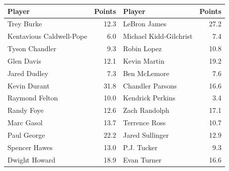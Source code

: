 \documentclass[letterpaper]{exam}
\begin{document}
\begin{questions}
      \begin{table}[ht]
        \centering
        \begin{tabular}{lr|lr}
          \toprule
          Player                   & Points & Player                 & Points\\
          \midrule
          Trey Burke               & 12.3   & LeBron James           & 27.2 \\
          Kentavious Caldwell-Pope & 6.0    & Michael Kidd-Gilchrist & 7.4 \\
          Tyson Chandler           & 9.3    & Robin Lopez            & 10.8 \\
          Glen Davis               & 12.1   & Kevin Martin           & 19.2 \\
          Jared Dudley             & 7.3    & Ben McLemore           & 7.6 \\
          Kevin Durant             & 31.8   & Chandler Parsons       & 16.6 \\
          Raymond Felton           & 10.0   & Kendrick Perkins       & 3.4 \\
          Randy Foye               & 12.6   & Zach Randolph          & 17.1 \\
          Marc Gasol               & 13.7   & Terrence Ross          & 10.7 \\
          Paul George              & 22.2   & Jared Sullinger        & 12.9 \\
          Spencer Hawes            & 13.0   & P.J. Tucker            & 9.3 \\
          Dwight Howard            & 18.9   & Evan Turner            & 16.6 \\
          \bottomrule
        \end{tabular}
      \end{table}

      \begin{parts}

\end{parts}
\end{questions}
\end{document}
